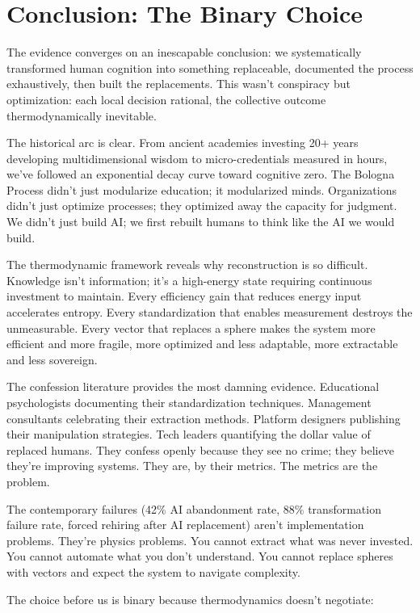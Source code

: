 \section{Conclusion: The Binary Choice}

The evidence converges on an inescapable conclusion: we systematically transformed human cognition into something replaceable, documented the process exhaustively, then built the replacements. This wasn't conspiracy but optimization: each local decision rational, the collective outcome thermodynamically inevitable.

The historical arc is clear. From ancient academies investing 20+ years developing multidimensional wisdom to micro-credentials measured in hours, we've followed an exponential decay curve toward cognitive zero. The Bologna Process didn't just modularize education; it modularized minds. Organizations didn't just optimize processes; they optimized away the capacity for judgment. We didn't just build AI; we first rebuilt humans to think like the AI we would build.

The thermodynamic framework reveals why reconstruction is so difficult. Knowledge isn't information; it's a high-energy state requiring continuous investment to maintain. Every efficiency gain that reduces energy input accelerates entropy. Every standardization that enables measurement destroys the unmeasurable. Every vector that replaces a sphere makes the system more efficient and more fragile, more optimized and less adaptable, more extractable and less sovereign.

The confession literature provides the most damning evidence. Educational psychologists documenting their standardization techniques. Management consultants celebrating their extraction methods. Platform designers publishing their manipulation strategies. Tech leaders quantifying the dollar value of replaced humans. They confess openly because they see no crime; they believe they're improving systems. They are, by their metrics. The metrics are the problem.

The contemporary failures (42\% AI abandonment rate, 88\% transformation failure rate, forced rehiring after AI replacement) aren't implementation problems. They're physics problems. You cannot extract what was never invested. You cannot automate what you don't understand. You cannot replace spheres with vectors and expect the system to navigate complexity.

The choice before us is binary because thermodynamics doesn't negotiate:

